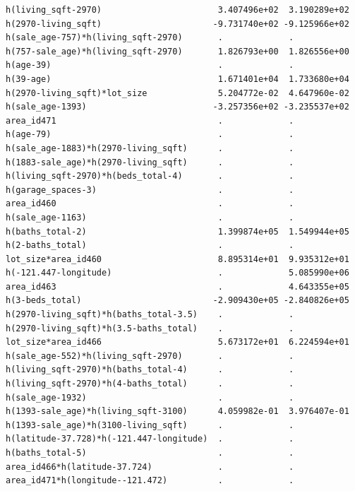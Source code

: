 \documentclass[
]{article}
\begin{document}
\begin{verbatim}
h(living_sqft-2970)                       3.407496e+02  3.190289e+02
h(2970-living_sqft)                      -9.731740e+02 -9.125966e+02
h(sale_age-757)*h(living_sqft-2970)       .             .           
h(757-sale_age)*h(living_sqft-2970)       1.826793e+00  1.826556e+00
h(age-39)                                 .             .           
h(39-age)                                 1.671401e+04  1.733680e+04
h(2970-living_sqft)*lot_size              5.204772e-02  4.647960e-02
h(sale_age-1393)                         -3.257356e+02 -3.235537e+02
area_id471                                .             .           
h(age-79)                                 .             .           
h(sale_age-1883)*h(2970-living_sqft)      .             .           
h(1883-sale_age)*h(2970-living_sqft)      .             .           
h(living_sqft-2970)*h(beds_total-4)       .             .           
h(garage_spaces-3)                        .             .           
area_id460                                .             .           
h(sale_age-1163)                          .             .           
h(baths_total-2)                          1.399874e+05  1.549944e+05
h(2-baths_total)                          .             .           
lot_size*area_id460                       8.895314e+01  9.935312e+01
h(-121.447-longitude)                     .             5.085990e+06
area_id463                                .             4.643355e+05
h(3-beds_total)                          -2.909430e+05 -2.840826e+05
h(2970-living_sqft)*h(baths_total-3.5)    .             .           
h(2970-living_sqft)*h(3.5-baths_total)    .             .           
lot_size*area_id466                       5.673172e+01  6.224594e+01
h(sale_age-552)*h(living_sqft-2970)       .             .           
h(living_sqft-2970)*h(baths_total-4)      .             .           
h(living_sqft-2970)*h(4-baths_total)      .             .           
h(sale_age-1932)                          .             .           
h(1393-sale_age)*h(living_sqft-3100)      4.059982e-01  3.976407e-01
h(1393-sale_age)*h(3100-living_sqft)      .             .           
h(latitude-37.728)*h(-121.447-longitude)  .             .           
h(baths_total-5)                          .             .           
area_id466*h(latitude-37.724)             .             .           
area_id471*h(longitude--121.472)          .             .           
                                                                    

\end{verbatim}
\end{document}
